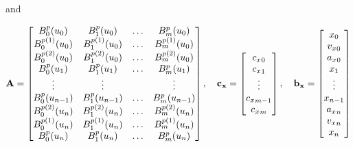 and

\begin{equation*}
{\bf A}=   \begin{bmatrix} %
      B_0^p(u_0)        & B_1^p(u_0)         & \ldots & B_m^p(u_0) \\
      B_0^{p(1)}(u_0) & B_1^{p(1)}(u_0) & \ldots & B_m^{p(1)}(u_0) \\
      B_0^{p(2)}(u_0) & B_1^{p(2)}(u_0) & \ldots & B_m^{p(2)}(u_0) \\
      B_0^p(u_1)         & B_1^p(u_1)         & \ldots & B_m^p(u_1) \\
      \vdots			&\vdots		     &            &\vdots \\
      B_0^p(u_{n-1})        & B_1^p(u_{n-1})         & \ldots & B_m^p(u_{n-1}) \\
      B_0^{p(2)}(u_n) & B_1^{p(2)}(u_n) & \ldots & B_m^{p(2)}(u_n) \\
      B_0^{p(1)}(u_n) & B_1^{p(1)}(u_n) & \ldots & B_m^{p(1)}(u_n) \\
      B_0^p(u_n)         & B_1^p(u_n)         & \ldots & B_m^p(u_n) \\
      
   \end{bmatrix},
   \quad 
   {\bf c_x} = \begin{bmatrix}
   {c_x}_0\\
   {c_x}_1\\
   \vdots \\
   {c_x}_{m-1}\\
   {c_x}_{m} 
    \end{bmatrix},
    \quad
   {\bf b_x} =  \begin{bmatrix}
   x_0\\
   {v_x}_0\\
   {a_x}_0\\
   x_1\\
   \vdots \\
   x_{n-1} \\
   {a_x}_n\\
   {v_x}_n\\
   x_n
    \end{bmatrix}
\end{equation*}






